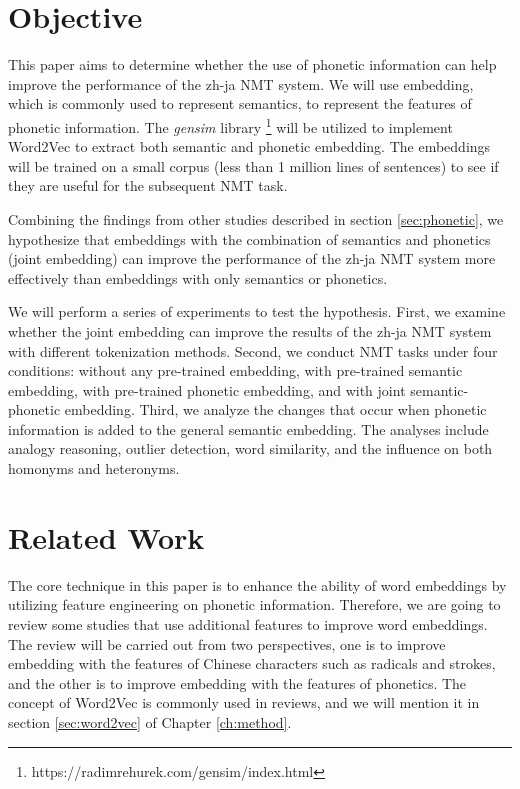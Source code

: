 \section{Objective} \label{sec:objective}

This paper aims to determine whether the use of phonetic information can help improve the performance of the zh-ja NMT system. We will use embedding, which is commonly used to represent semantics, to represent the features of phonetic information. The \textit{gensim} library \footnote{https://radimrehurek.com/gensim/index.html} will be utilized to implement Word2Vec \cite{mikolov2013efficient} to extract both semantic and phonetic embedding. The embeddings will be trained on a small corpus (less than 1 million lines of sentences) to see if they are useful for the subsequent NMT task.

Combining the findings from other studies \cite{liu-etal-2019-robust, khan2019diversity} described in section \ref{sec:phonetic}, we hypothesize that embeddings with the combination of semantics and phonetics (joint embedding) can improve the performance of the zh-ja NMT system more effectively than embeddings with only semantics or phonetics. 

We will perform a series of experiments to test the hypothesis. First, we examine whether the joint embedding can improve the results of the zh-ja NMT system with different tokenization methods. Second, we conduct NMT tasks under four conditions: without any pre-trained embedding, with pre-trained semantic embedding, with pre-trained phonetic embedding, and with joint semantic-phonetic embedding. Third, we analyze the changes that occur when phonetic information is added to the general semantic embedding. The analyses include analogy reasoning, outlier detection, word similarity, and the influence on both homonyms and heteronyms.

\section{Related Work} \label{sec:related_work}

The core technique in this paper is to enhance the ability of word embeddings by utilizing feature engineering on phonetic information. Therefore, we are going to review some studies that use additional features to improve word embeddings. The review will be carried out from two perspectives, one is to improve embedding with the features of Chinese characters such as radicals and strokes, and the other is to improve embedding with the features of phonetics. The concept of Word2Vec \cite{mikolov2013efficient} is commonly used in reviews, and we will mention it in section \ref{sec:word2vec} of Chapter \ref{ch:method}.

